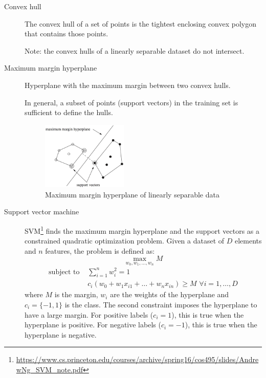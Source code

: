 \begin{description}
    \item[Convex hull]
        The convex hull of a set of points is the tightest enclosing convex polygon that contains those points.

        Note: the convex hulls of a linearly separable dataset do not intersect.

    \item[Maximum margin hyperplane] 
        Hyperplane with the maximum margin between two convex hulls.

        In general, a subset of points (support vectors)  
        in the training set is sufficient to define the hulls.

        \begin{figure}[H]
            \centering
            \includegraphics[width=0.4\textwidth]{img/svm.png}
            \caption{Maximum margin hyperplane of linearly separable data}
        \end{figure}

    \item[Support vector machine] 
        SVM\footnote{\scriptsize\url{https://www.cs.princeton.edu/courses/archive/spring16/cos495/slides/AndrewNg_SVM_note.pdf}} 
        finds the maximum margin hyperplane and the support vectors as a constrained quadratic optimization problem.
        Given a dataset of $D$ elements and $n$ features, the problem is defined as:
        \[ \max_{w_0, w_1, \dots, w_n} M \]
        \[ 
            \begin{split}
                \text{subject to }  & \sum_{i=1}^{n} w_i^2 = 1 \\
                                    & c_i(w_0 + w_1 x_{i1} + \dots + w_n x_{in}) \geq M \,\, \forall i = 1, \dots, D
            \end{split}    
        \]
        where $M$ is the margin, $w_i$ are the weights of the hyperplane and $c_i = \{-1, 1 \}$ is the class.
        The second constraint imposes the hyperplane to have a large margin. 
        For positive labels ($c_i=1$), this is true when the hyperplane is positive.
        For negative labels ($c_i=-1$), this is true when the hyperplane is negative.


\end{description}
